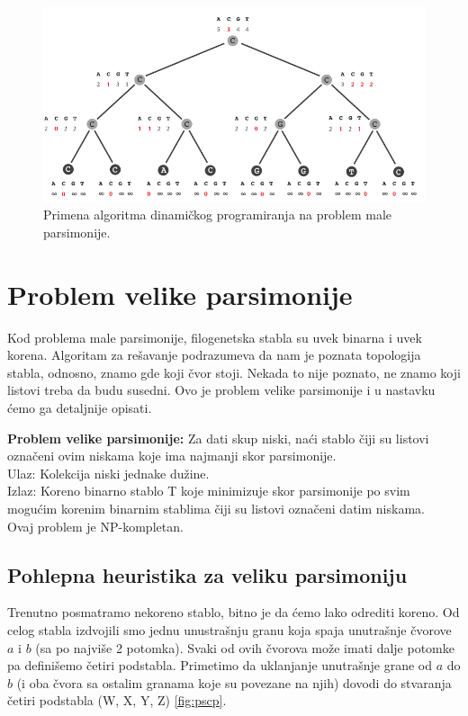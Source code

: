 \begin{figure}[h]
	\centering
	\includegraphics[width=\textwidth]{poglavlja/7/slike/dpMalaParsemonija.png}
	\caption{Primena algoritma dinamičkog programiranja na problem male parsimonije.}
	\label{slika:dpMP}
\end{figure}


\section{Problem velike parsimonije}
\label{sec:pvp}

Kod problema male parsimonije, filogenetska stabla su uvek binarna i uvek korena. Algoritam za rešavanje podrazumeva da nam je poznata topologija stabla, odnosno, znamo gde koji čvor stoji. Nekada to nije poznato, ne znamo koji listovi treba da budu susedni. Ovo je problem velike parsimonije i u nastavku ćemo ga detaljnije opisati.


\begin{tcolorbox}
\textbf{Problem velike parsimonije:} Za dati skup niski, na\'ci stablo \v{c}iji su listovi ozna\v{c}eni ovim niskama koje ima najmanji skor parsimonije. \\
Ulaz: Kolekcija niski jednake du\v{z}ine. \\
Izlaz: Koreno binarno stablo T koje minimizuje skor parsimonije po svim mogu\'cim korenim binarnim stablima \v{c}iji su listovi ozna\v{c}eni datim niskama.\\
Ovaj problem je NP-kompletan.
\end{tcolorbox}

\subsection{Pohlepna heuristika za veliku parsimoniju}
\label{phzvp}

Trenutno posmatramo nekoreno stablo, bitno je da ćemo lako odrediti koreno. Od celog stabla izdvojili smo jednu unustrašnju granu koja spaja unutrašnje čvorove $a$ i $b$ (sa po najviše 2 potomka). Svaki od ovih čvorova može imati dalje potomke pa definišemo četiri podstabla. Primetimo da uklanjanje unutra\v{s}nje grane od $a$ do $b$ (i oba čvora sa ostalim granama koje su povezane na njih) dovodi do stvaranja \v{c}etiri podstabla (W, X, Y, Z) \ref{fig:pscp}. 

